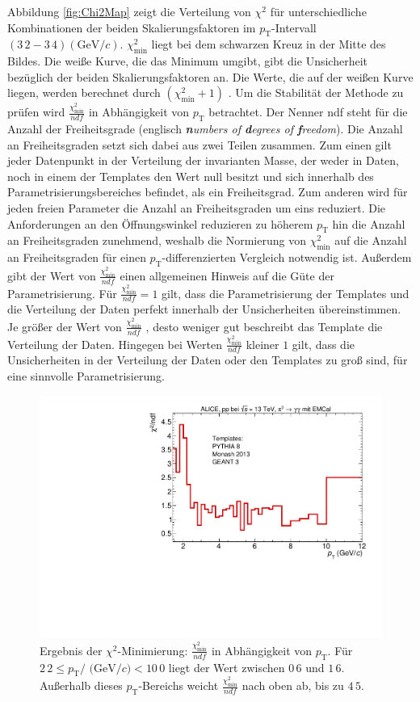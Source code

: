 \newline
Abbildung \ref{fig:Chi2Map} zeigt die Verteilung von $\chi^{2}$ für unterschiedliche Kombinationen der beiden Ska\-lie\-rungs\-fak\-to\-ren im $p_{\text{T}}$-Intervall $(3\,2 - 3\,4)(\text{GeV}/c)$.
$\chi^{2}_\text{min}$ liegt bei dem schwarzen Kreuz in der Mitte des Bildes.
Die weiße Kurve, die das Minimum umgibt, gibt die Unsicherheit bezüglich der beiden Skalierungsfaktoren an.
Die Werte, die auf der weißen Kurve liegen, werden berechnet durch $\left(\chi^{2}_\text{min}+1\right)$ \cite{book:chi2}.
\newline
Um die Stabilität der Methode zu prüfen wird $\frac{\chi^{2}_\text{min}}{ndf}$ in Abhängigkeit von $p_{\text{T}}$ betrachtet.
Der Nenner ndf steht für die Anzahl der Freiheitsgrade (englisch \textit{\textbf{n}umbers of \textbf{d}egrees of \textbf{f}reedom}).
Die Anzahl an Freiheitsgraden setzt sich dabei aus zwei Teilen zusammen.
Zum einen gilt jeder Datenpunkt in der Verteilung der invarianten Masse, der weder in Daten, noch in einem der Templates den Wert null besitzt und sich innerhalb des Parametrisierungsbereiches befindet, als ein Freiheitsgrad.
Zum anderen wird für jeden freien Parameter die Anzahl an Freiheitsgraden um eins reduziert.
Die Anforderungen an den Öffnungswinkel reduzieren zu höherem $p_{\text{T}}$ hin die Anzahl an Freiheitsgraden zunehmend, weshalb die Normierung von $\chi^{2}_\text{min}$ auf die Anzahl an Freiheitsgraden für einen $p_{\text{T}}$-differenzierten Vergleich notwendig ist.
Außerdem gibt der Wert von $\frac{\chi^{2}_\text{min}}{ndf}$ einen allgemeinen Hinweis auf die Güte der Parametrisierung.
Für $\frac{\chi^{2}_\text{min}}{ndf} = 1$ gilt, dass die Parametrisierung der Templates und die Verteilung der Daten perfekt innerhalb der Unsicherheiten übereinstimmen.
Je größer der Wert von $\frac{\chi^{2}_\text{min}}{ndf}$ , desto weniger gut beschreibt das Template die Verteilung der Daten.
Hingegen bei Werten $\frac{\chi^{2}_\text{min}}{ndf}$ kleiner $1$ gilt, dass die Unsicherheiten in der Verteilung der Daten oder den Templates zu groß sind, für eine sinnvolle Parametrisierung.
\begin{figure}[t!]
\centering
\includegraphics[width=.65\linewidth]{Chi2NoComp_Data_2016.pdf}
\caption{Ergebnis der $\chi^{2}$-Minimierung: $\frac{\chi^{2}_\text{min}}{ndf}$ in Abhängigkeit von $p_{\text{T}}$.
Für $2\,2 \leq p_{\text{T}}/\text{ (GeV}/c) < 10\,0$ liegt der Wert zwischen $0\,6$ und $1\,6$.
Außerhalb dieses $p_\text{T}$-Bereichs weicht $\frac{\chi^{2}_\text{min}}{ndf}$ nach oben ab, bis zu $4\,5$.
}
\label{fig:Chi2pT}
\end{figure}
